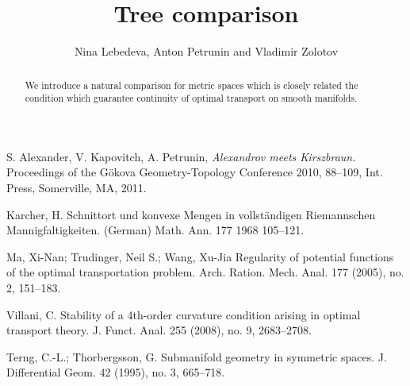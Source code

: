 \documentclass{article}
\begin{document}
\title{Tree comparison}
\author{Nina Lebedeva, Anton Petrunin and Vladimir Zolotov}


\newcommand{\Addresses}{{\bigskip\footnotesize
Anton Petrunin, \par\nopagebreak\textsc{Department of Mathematics, PSU, University Park, PA 16802, USA}
\par\nopagebreak
\textit{Email}: \texttt{petrunin@math.psu.edu}

\medskip
 
...
}}


\date{}

\maketitle

\begin{abstract}
We introduce a natural comparison for metric spaces which is closely related  the condition which guarantee continuity of optimal transport on smooth manifolds. 
\end{abstract}







\begin{thebibliography}{52}
 S. Alexander, V. Kapovitch, A. Petrunin, 
\emph{Alexandrov meets Kirszbraun.} 
Proceedings of the Gökova Geometry-Topology Conference 2010, 88--109, Int. Press, Somerville, MA, 2011.

Karcher, H.
Schnittort und konvexe Mengen in vollständigen Riemannschen Mannigfaltigkeiten. (German)
Math. Ann. 177 1968 105--121.

 Ma, Xi-Nan; Trudinger, Neil S.; Wang, Xu-Jia
Regularity of potential functions of the optimal transportation problem. 
Arch. Ration. Mech. Anal. 177 (2005), no. 2, 151--183. 

 Villani, C. Stability of a 4th-order curvature condition arising in optimal transport theory. J. Funct. Anal. 255 (2008), no. 9, 2683--2708.


 Terng, C.-L.; Thorbergsson, G. Submanifold geometry in symmetric spaces. J. Differential Geom. 42 (1995), no. 3, 665--718.
 
\end{thebibliography}
\end{document}

